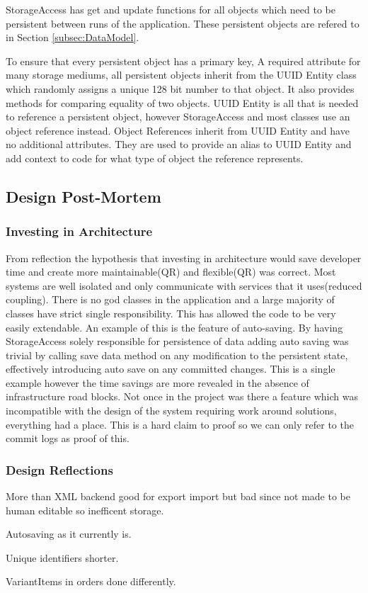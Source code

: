 StorageAccess has get and update functions for all objects which need to be persistent between runs of the application. These persistent objects are refered to in Section \ref{subsec:DataModel}. 

To ensure that every persistent object has a primary key, A required attribute for many storage mediums, all persistent objects inherit from the UUID Entity class which randomly assigns a unique 128 bit number to that object. It also provides methods for comparing equality of two objects. UUID Entity is all that is needed to reference a persistent object, however StorageAccess and most classes use an object reference instead. Object References inherit from UUID Entity and have no additional attributes. They are used to provide an alias to UUID Entity and add context to code for what type of object the reference represents.

\pagebreak

\subsection{Design Post-Mortem}
\subsubsection{Investing in Architecture}
From reflection the hypothesis that investing in architecture would save developer time and create more maintainable(QR) and flexible(QR) was correct. Most systems are well isolated and only communicate with services that it uses(reduced coupling). There is no god classes in the application and a large majority of classes have strict single responsibility. This has allowed the code to be very easily extendable. An example of this is the feature of auto-saving. By having StorageAccess solely responsible for persistence of data adding auto saving was trivial by calling save data method on any modification to the persistent state, effectively introducing auto save on any committed changes. This is a single example however the time savings are more revealed in the absence of infrastructure road blocks. Not once in the project was there a feature which was incompatible with the design of the system requiring work around solutions, everything had a place. This is a hard claim to proof so we can only refer to the commit logs as proof of this.

\subsubsection{Design Reflections}
More than XML backend good for export import but bad since not made to be human editable so inefficent storage.

Autosaving as it currently is.

Unique identifiers shorter.

VariantItems in orders done differently.